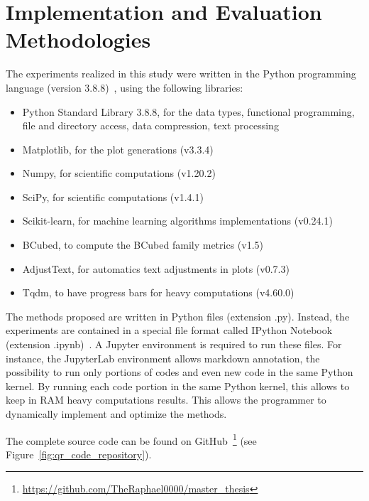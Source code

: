 \section{Implementation and Evaluation Methodologies}

The experiments realized in this study were written in the Python programming language (version 3.8.8)~\cite{python}, using the following libraries:

\begin{itemize}
  \item Python Standard Library 3.8.8, for the data types, functional programming, file and directory access, data compression, text processing~\cite{python_standard_library}
  \item Matplotlib, for the plot generations (v3.3.4)~\cite{matplotlib}
  \item Numpy, for scientific computations (v1.20.2)~\cite{numpy}
  \item SciPy, for scientific computations (v1.4.1)~\cite{scipy}
  \item Scikit-learn, for machine learning algorithms implementations (v0.24.1)~\cite{sklearn}
  \item BCubed, to compute the BCubed family metrics (v1.5)~\cite{bcubed_gh}
  \item AdjustText, for automatics text adjustments in plots (v0.7.3)~\cite{adjustText}
  \item Tqdm, to have progress bars for heavy computations (v4.60.0)~\cite{tqdm}
\end{itemize}

The methods proposed are written in Python files (extension .py).
Instead, the experiments are contained in a special file format called IPython Notebook (extension .ipynb)~\cite{jupyter}.
A Jupyter environment is required to run these files.
For instance, the JupyterLab environment allows markdown annotation, the possibility to run only portions of codes and even new code in the same Python kernel.
By running each code portion in the same Python kernel, this allows to keep in RAM heavy computations results.
This allows the programmer to dynamically implement and optimize the methods.

The complete source code can be found on GitHub~\footnote{\url{https://github.com/TheRaphael0000/master_thesis}} (see Figure~\ref{fig:qr_code_repository}).

